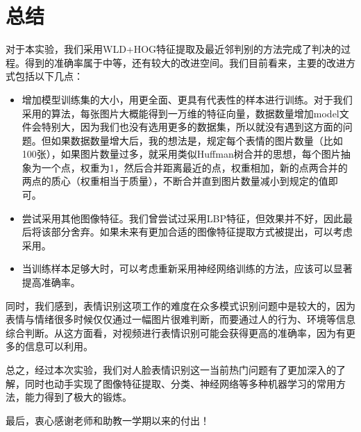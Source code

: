 \documentclass[UTF8]{ctexart}
\begin{document}
\section{总结}

对于本实验，我们采用WLD+HOG特征提取及最近邻判别的方法完成了判决的过程。得到的准确率属于中等，还有较大的改进空间。我们目前看来，主要的改进方式包括以下几点：
\begin{itemize}
  \item 增加模型训练集的大小，用更全面、更具有代表性的样本进行训练。对于我们采用的算法，每张图片大概能得到一万维的特征向量，数据数量增加model文件会特别大，因为我们也没有选用更多的数据集，所以就没有遇到这方面的问题。但如果数据数量增大后，我的想法是，规定每个表情的图片数量（比如100张），如果图片数量过多，就采用类似Huffman树合并的思想，每个图片抽象为一个点，权重为1，然后合并距离最近的点，权重相加，新的点两合并的两点的质心（权重相当于质量），不断合并直到图片数量减小到规定的值即可。
  \item 尝试采用其他图像特征。我们曾尝试过采用LBP特征，但效果并不好，因此最后将该部分舍弃。如果未来有更加合适的图像特征提取方式被提出，可以考虑采用。
  \item 当训练样本足够大时，可以考虑重新采用神经网络训练的方法，应该可以显著提高准确率。
\end{itemize}

同时，我们感到，表情识别这项工作的难度在众多模式识别问题中是较大的，因为表情与情绪很多时候仅仅通过一幅图片很难判断，而要通过人的行为、环境等信息综合判断。从这方面看，对视频进行表情识别可能会获得更高的准确率，因为有更多的信息可以利用。

总之，经过本次实验，我们对人脸表情识别这一当前热门问题有了更加深入的了解，同时也动手实现了图像特征提取、分类、神经网络等多种机器学习的常用方法，能力得到了极大的锻炼。

最后，衷心感谢老师和助教一学期以来的付出！



\end{document}
